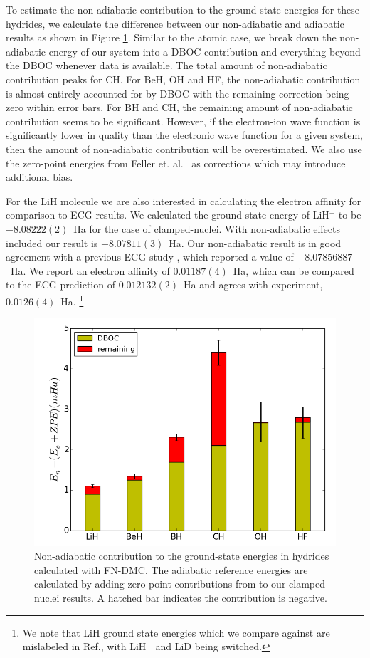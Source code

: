 \documentclass[pra,superscriptaddress,groupedaddress,twocolumn]{revtex4}
\begin{document}
To estimate the non-adiabatic contribution to the ground-state energies for these hydrides, we calculate the difference between our non-adiabatic and adiabatic results as shown in Figure \ref{fig:dia-nad-ad}. Similar to the atomic case, we break down the non-adiabatic energy of our system into a DBOC contribution and everything beyond the DBOC whenever data is available. The total amount of non-adiabatic contribution peaks for CH. For BeH, OH and HF, the non-adiabatic contribution is almost entirely accounted for by DBOC with the remaining correction being zero within error bars. For BH and CH, the remaining amount of non-adiabatic contribution seems to be significant. However, if the electron-ion wave function is significantly lower in quality than the electronic wave function for a given system, then the amount of non-adiabatic contribution will be overestimated. We also use the zero-point energies from Feller et. al.~\cite{Feller_Corrections} as corrections which may introduce additional bias.

For the LiH molecule we are also interested in calculating the electron affinity for comparison to ECG results. We calculated the ground-state energy of LiH$^-$ to be $-8.08222(2)$~Ha for the case of clamped-nuclei. With non-adiabatic effects included our result is  $-8.07811(3)$~Ha. Our non-adiabatic result is in good agreement with a previous ECG study \cite{Bubin_LiH_noBO}, which reported a value of $-8.07856887$~Ha. We report an electron affinity of $0.01187(4)$~Ha, which can be compared to the ECG prediction of $0.012132(2)$~Ha and agrees with experiment, $0.0126(4)$~Ha. \footnote{We note that LiH ground state energies which we compare against are mislabeled in Ref.\cite{Bubin_LiH_noBO}, with $\text{LiH}^-$ and LiD being switched.}

\begin{figure}[h]
\includegraphics[scale=.37]{Figures/dia-nad-ad}
\caption{Non-adiabatic contribution to the ground-state energies in hydrides calculated with FN-DMC. The adiabatic reference energies are calculated by adding zero-point contributions from \cite{Feller_Corrections} to our clamped-nuclei results. A hatched bar indicates the contribution is negative. \label{fig:dia-nad-ad}}
\end{figure}
\end{document}
